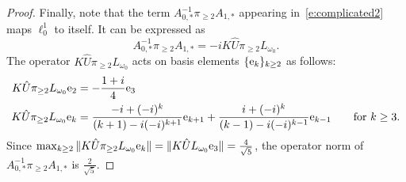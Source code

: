 \begin{proof}
Finally, note that the term $A_{0,*}^{-1}  \pi_{\geq 2} A_{1,*}$
appearing in~\eqref{e:complicated2} maps $\ell^1_0$ to itself. It can be expressed as
\[
A_{0,*}^{-1}  \pi_{\geq 2} A_{1,*}  = - i K \hat{U} \pi_{\geq 2} L_{\omega_0} .
\]
The operator $K \hat{U} \pi_{\geq 2} L_{\omega_0}$
 acts on basis elements $\{ \mathrm{e}_k\}_{k \geq 2}$ as follows:
\begin{alignat*}{1}
	K \hat{U} \pi_{\geq 2}  L_{\omega_0}  \mathrm{e}_2 &= -\frac{1+i}{4} \mathrm{e}_{3}  \\
	K \hat{U} \pi_{\geq 2}  L_{\omega_0}  \mathrm{e}_{k} &= \frac{-i+(-i)^k}{(k+1)-i (-i)^{k+1}} \mathrm{e}_{k+1} + \frac{i+(-i)^k}{(k-1) - i (-i)^{k-1}} \mathrm{e}_{k-1}
	\qquad\text{for } k \geq 3.
\end{alignat*}
Since $\max_{k\geq 2 } \| K \hat{U} \pi_{\geq 2} L_{\omega_0} \mathrm{e}_k \| = \| K
\hat{U} L_{\omega_0} \mathrm{e}_3 \| = \tfrac{4}{\sqrt{5}}$, 
the operator norm of $A_{0,*}^{-1}  \pi_{\geq 2} A_{1,*}$ is $\tfrac{2}{\sqrt{5}}$.


\end{proof}
